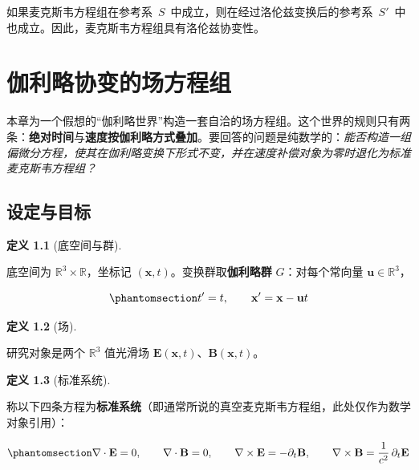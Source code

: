 \documentclass[
  chinese,
  a4paper,
  UTF8,
  12pt,
  oneside,
  openany]{ctexbook}
\theoremstyle{plain}
\theoremstyle{plain}
\theoremstyle{plain}
\theoremstyle{definition}
\newtheorem{definition}{定义}[chapter]
\theoremstyle{plain}
\theoremstyle{plain}
\theoremstyle{remark}
\begin{document}
如果麦克斯韦方程组在参考系~\(S\)~中成立，则在经过洛伦兹变换后的参考系~\(S'\)~中也成立。因此，麦克斯韦方程组具有洛伦兹协变性。

\newpage


\chapter{伽利略协变的场方程组}\label{sec-galilean-electrodynamics}

本章为一个假想的``伽利略世界''构造一套自洽的场方程组。这个世界的规则只有两条：\textbf{绝对时间}与\textbf{速度按伽利略方式叠加}。要回答的问题是纯数学的：\emph{能否构造一组偏微分方程，使其在伽利略变换下形式不变，并在速度补偿对象为零时退化为标准麦克斯韦方程组？}

\section{设定与目标}\label{sec-gal-setup}

\begin{definition}[底空间与群]\protect\hypertarget{def-space-group}{}\label{def-space-group}

底空间为 \(\mathbb{R}^{3}\times\mathbb{R}\)，坐标记
\((\mathbf{x},t)\)。变换群取\textbf{伽利略群} \(G\)：对每个常向量
\(\mathbf{u}\in\mathbb{R}^{3}\)，

\begin{equation}\protect\phantomsection\label{eq-gal-transform}{
t' = t, \qquad \mathbf{x}' = \mathbf{x} - \mathbf{u}t
}\end{equation}

\end{definition}

\begin{definition}[场]\protect\hypertarget{def-fields}{}\label{def-fields}

研究对象是两个 \(\mathbb{R}^{3}\) 值光滑场
\(\mathbf{E}(\mathbf{x},t)\)、\(\mathbf{B}(\mathbf{x},t)\)。

\end{definition}

\begin{definition}[标准系统]\protect\hypertarget{def-standard-system}{}\label{def-standard-system}

称以下四条方程为\textbf{标准系统}（即通常所说的真空麦克斯韦方程组，此处仅作为数学对象引用）：

\begin{equation}\protect\phantomsection\label{eq-standard-maxwell}{
\nabla\cdot\mathbf{E} = 0, \qquad
\nabla\cdot\mathbf{B} = 0, \qquad
\nabla\times\mathbf{E} = -\partial_{t}\mathbf{B}, \qquad
\nabla\times\mathbf{B} = \frac{1}{c^{2}}\,\partial_{t}\mathbf{E}
}\end{equation}

\end{definition}
\end{document}
